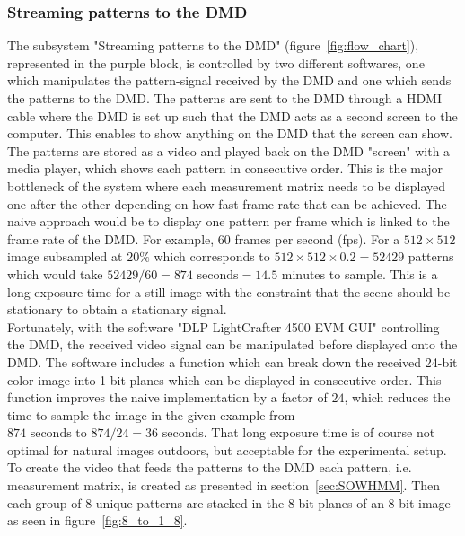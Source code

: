 \subsubsection{Streaming patterns to the DMD}
\label{sec:stream_dmd}
The subsystem "Streaming patterns to the DMD" (figure~\ref{fig:flow_chart}), represented in the purple block, is controlled by two different softwares, one which manipulates the pattern-signal received by the DMD and one which sends the patterns to the DMD. The patterns are sent to the DMD through a HDMI cable where the DMD is set up such that the DMD acts as a second screen to the computer. This enables to show anything on the DMD that the screen can show. The patterns are stored as a video and played back on the DMD "screen" with a media player, which shows each pattern in consecutive order. This is the major bottleneck of the system where each measurement matrix needs to be displayed one after the other depending on how fast frame rate that can be achieved. The naive approach would be to display one pattern per frame which is linked to the frame rate of the DMD. For example, 60 frames per second (fps). For a $512\times 512$ image subsampled at $20\%$ which corresponds to $512\times 512 \times 0.2 = 52429$ patterns which would take $52429/60 = 874 \text{ seconds} = 14.5 \text{ minutes}$ to sample. This is a long exposure time for a still image with the constraint that the scene should be stationary to obtain a stationary signal.\\[0.1in]

Fortunately, with the software "DLP LightCrafter 4500 EVM GUI" controlling the DMD, the received video signal can be manipulated before displayed onto the DMD. The software includes a function which can break down the received 24-bit color image into 1 bit planes which can be displayed in consecutive order. This function improves the naive implementation by a factor of $24$, which reduces the time to sample the image in the given example from $874 \text{ seconds to } 874/24 = 36 \text{ seconds}$. That long exposure time is of course not optimal for natural images outdoors, but acceptable for the experimental setup.\\[0.1in]     


To create the video that feeds the patterns to the DMD each pattern,  i.e. measurement matrix, is created as presented in section~\ref{sec:SOWHMM}. Then each group of 8 unique patterns are stacked in the 8 bit planes of an 8 bit image as seen in figure~\ref{fig:8_to_1_8}.

